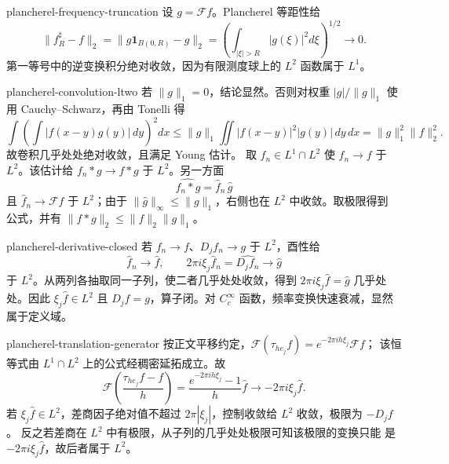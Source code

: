 \begin{solution}{plancherel-frequency-truncation}
设 \(g=\mathcal Ff\)。Plancherel 等距性给
\[
 \|f_R^\sharp-f\|_2
 =\|g\mathbf1_{B(0,R)}-g\|_2
 =\left(\int_{|\xi|>R}|g(\xi)|^2d\xi\right)^{1/2}\to0.
\]
第一等号中的逆变换积分绝对收敛，因为有限测度球上的 \(L^2\) 函数属于
\(L^1\)。
\end{solution}

\begin{solution}{plancherel-convolution-ltwo}
若 \(\|g\|_1=0\)，结论显然。否则对权重 \(|g|/\|g\|_1\) 使用
Cauchy--Schwarz，再由 Tonelli 得
\[
 \int\left(\int|f(x-y)g(y)|\,dy\right)^2dx
 \le\|g\|_1\iint|f(x-y)|^2|g(y)|\,dy\,dx
 =\|g\|_1^2\|f\|_2^2.
\]
故卷积几乎处处绝对收敛，且满足 Young 估计。
取 \(f_n\in L^1\cap L^2\) 使 \(f_n\to f\) 于 \(L^2\)。该估计给
\(f_n*g\to f*g\) 于 \(L^2\)。另一方面
\[
 \widehat{f_n*g}=\widehat f_n\,\widehat g
\]
且 \(\widehat f_n\to\mathcal Ff\) 于 \(L^2\)；由于
\(\|\widehat g\|_\infty\le\|g\|_1\)，右侧也在 \(L^2\) 中收敛。取极限得到
公式，并有 \(\|f*g\|_2\le\|f\|_2\|g\|_1\)。
\end{solution}

\begin{solution}{plancherel-derivative-closed}
若 \(f_n\to f\)、\(D_jf_n\to g\) 于 \(L^2\)，酉性给
\[
 \widehat f_n\to\widehat f,\qquad
 2\pi i\xi_j\widehat f_n=\widehat{D_jf_n}\to\widehat g
\]
于 \(L^2\)。从两列各抽取同一子列，使二者几乎处处收敛，得到
\(2\pi i\xi_j\widehat f=\widehat g\) 几乎处处。因此
\(\xi_j\widehat f\in L^2\) 且 \(D_jf=g\)，算子闭。对
\(C_c^\infty\) 函数，频率变换快速衰减，显然属于定义域。
\end{solution}

\begin{solution}{plancherel-translation-generator}
按正文平移约定，\(\mathcal F(\tau_{he_j}f)=e^{-2\pi ih\xi_j}\mathcal Ff\)；
该恒等式由 \(L^1\cap L^2\) 上的公式经稠密延拓成立。故
\[
 \mathcal F\!\left(\frac{\tau_{he_j}f-f}{h}\right)
 =\frac{e^{-2\pi ih\xi_j}-1}{h}\widehat f
 \longrightarrow-2\pi i\xi_j\widehat f.
\]
若 \(\xi_j\widehat f\in L^2\)，差商因子绝对值不超过
\(2\pi|\xi_j|\)，控制收敛给 \(L^2\) 收敛，极限为 \(-D_jf\)。
反之若差商在 \(L^2\) 中有极限，从子列的几乎处处极限可知该极限的变换只能
是 \(-2\pi i\xi_j\widehat f\)，故后者属于 \(L^2\)。
\end{solution}

